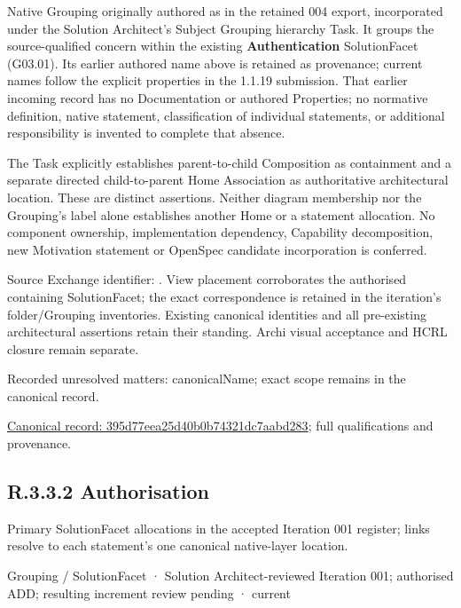 Native Grouping originally authored as \texttt{} in the retained 004 export,
incorporated under the Solution Architect's Subject Grouping hierarchy Task.
It groups the source-qualified \texttt{} concern within
the existing \textbf{Authentication} SolutionFacet (G03.01). Its earlier authored name above is retained as provenance; current names
follow the explicit properties in the 1.1.19 submission.
That earlier incoming record has no Documentation or authored Properties; no normative
definition, native statement, classification of individual statements, or
additional responsibility is invented to complete that absence.



The Task explicitly establishes parent-to-child Composition as containment and
a separate directed child-to-parent Home Association as authoritative architectural
location. These are distinct assertions. Neither diagram membership nor the
Grouping's label alone establishes another Home or a statement allocation.
No component ownership, implementation dependency, Capability decomposition,
new Motivation statement or OpenSpec candidate incorporation is conferred.



Source Exchange identifier: \texttt{}. View placement corroborates
the authorised containing SolutionFacet; the exact correspondence is retained in the
iteration's folder/Grouping inventories. Existing canonical identities and all
pre-existing architectural assertions retain their standing. Archi visual
acceptance and HCRL closure remain separate.


{\small Recorded unresolved matters: canonicalName; exact scope remains in the canonical record.}\par
{\footnotesize \href{../../../../../../../continuum/grouping/395d77eea25d40b0b74321dc7aabd283.md}{Canonical record: 395d77eea25d40b0b74321dc7aabd283}; full qualifications and provenance.}\par
\subsection*{R.3.3.2 Authorisation}
\label{navigation:R.3.3.2}

Primary SolutionFacet allocations in the accepted Iteration 001 register; links resolve to each statement’s one canonical native-layer location.\par
\label{element:4648cf5a1f8e4333978c13efae10eaa5}
{\small Grouping / SolutionFacet · Solution Architect-reviewed Iteration 001; authorised ADD; resulting increment review pending · current}\par

